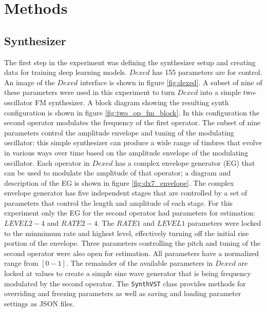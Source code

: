 \section{Methods}

\subsection{Synthesizer}
The first step in the experiment was defining the synthesizer setup and creating data for training deep learning models. $Dexed$ has 155 parameters are for control. An image of the $Dexed$ interface is shown in figure \ref{fig:dexed}. A subset of nine of these parameters were used in this experiment to turn $Dexed$ into a simple two-oscillator FM synthesizer. A block diagram showing the resulting synth configuration is shown in figure \ref{fig:two_op_fm_block}. In this configuration the second operator modulates the frequency of the first operator. The subset of nine parameters control the amplitude envelope and tuning of the modulating oscillator; this simple synthesizer can produce a wide range of timbres that evolve in various ways over time based on the amplitude envelope of the modulating oscillator. Each operator in $Dexed$ has a complex envelope generator (EG) that can be used to modulate the amplitude of that operator; a diagram and description of the EG is shown in figure \ref{fig:dx7_envelope}. The complex envelope generator has five independent stages that are controlled by a set of parameters that control the length and amplitude of each stage. For this experiment only the EG for the second operator had parameters for estimation: $LEVEL 2-4$ and $RATE 2-4$. The $RATE 1$ and $LEVEL 1$ parameters were locked to the minmimum rate and highest level, effectively turning off the initial rise portion of the envelope. Three parameters controlling the pitch and tuning of the second operator were also open for estimation. All parameters have a normalized range from $[0-1]$. The remainder of the available parameters in $Dexed$ are locked at values to create a simple sine wave generator that is being frequency modulated by the second operator. The \texttt{SynthVST} class provides methods for overriding and freezing parameters as well as saving and loading parameter settings as JSON files. 

